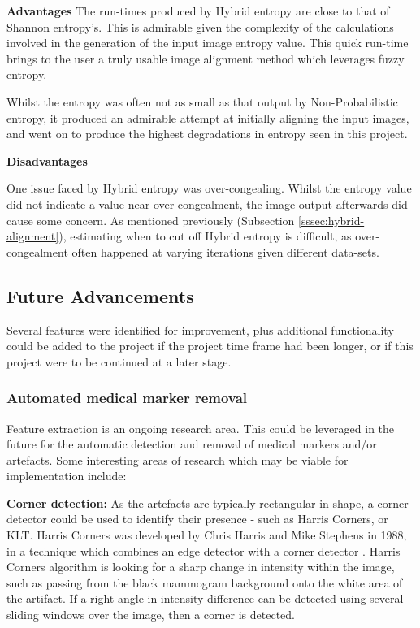 \noindent \textbf{Advantages}
The run-times produced by Hybrid entropy are close to that of Shannon entropy's. This is admirable given the complexity of the calculations involved in the generation of the input image entropy value. This quick run-time brings to the user a truly usable image alignment method which leverages fuzzy entropy.

Whilst the entropy was often not as small as that output by Non-Probabilistic entropy, it produced an admirable attempt at initially aligning the input images, and went on to produce the highest degradations in entropy seen in this project.

\noindent \textbf{Disadvantages}

One issue faced by Hybrid entropy was over-congealing. Whilst the entropy value did not indicate a value near over-congealment, the image output afterwards did cause some concern. As mentioned previously (Subsection \ref{sssec:hybrid-alignment}), estimating when to cut off Hybrid entropy is difficult, as over-congealment often happened at varying iterations given different data-sets.

\subsection{Future Advancements}

Several features were identified for improvement, plus additional functionality could be added to the project if the project time frame had been longer, or if this project were to be continued at a later stage.

\subsubsection{Automated medical marker removal}
Feature extraction is an ongoing research area. This could be leveraged in the future for the automatic detection and removal of medical markers and/or artefacts. Some interesting areas of research which may be viable for implementation include:

\noindent \textbf{Corner detection: } As the artefacts are typically rectangular in shape, a corner detector could be used to identify their presence - such as Harris Corners, or KLT. Harris Corners was developed by Chris Harris and Mike Stephens in 1988, in a technique which combines an edge detector with a corner detector \cite{Harris_Stephens_1988}. Harris Corners algorithm is looking for a sharp change in intensity within the image, such as passing from the black mammogram background onto the white area of the artifact. If a right-angle in intensity difference can be detected using several sliding windows over the image, then a corner is detected.

